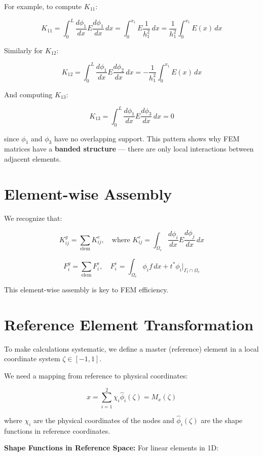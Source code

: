 \documentclass[
  11pt,
  a4paper,
]{scrbook}
\begin{document}
For example, to compute \(K_{11}\):

\[K_{11} = \int_0^L \frac{d\phi_1}{dx} E \frac{d\phi_1}{dx} \, dx = \int_0^{x_1} E \frac{1}{h_1^2} \, dx = \frac{1}{h_1^2} \int_0^{x_1} E(x) \, dx\]

Similarly for \(K_{12}\):

\[K_{12} = \int_0^L \frac{d\phi_1}{dx} E \frac{d\phi_2}{dx} \, dx = -\frac{1}{h_1^2} \int_0^{x_1} E(x) \, dx\]

And computing \(K_{13}\):

\[K_{13} = \int_0^L \frac{d\phi_1}{dx} E \frac{d\phi_3}{dx} \, dx = 0\]

since \(\phi_1\) and \(\phi_3\) have no overlapping support. This
pattern shows why FEM matrices have a \textbf{banded structure} ---
there are only local interactions between adjacent elements.

\section{Element-wise Assembly}\label{element-wise-assembly}

We recognize that:

\[K_{ij}^g = \sum_{\text{elem}} K_{ij}^e, \quad \text{where } K_{ij}^e = \int_{\Omega_e} \frac{d\phi_i}{dx} E \frac{d\phi_j}{dx} \, dx\]

\[F_i^g = \sum_{\text{elem}} F_i^e, \quad F_i^e = \int_{\Omega_e} \phi_i f \, dx + t^* \phi_i|_{\Gamma_t \cap \Omega_e}\]

This element-wise assembly is key to FEM efficiency.

\section{Reference Element
Transformation}\label{reference-element-transformation}

To make calculations systematic, we define a master (reference) element
in a local coordinate system \(\zeta \in [-1, 1]\).

We need a mapping from reference to physical coordinates:

\[x = \sum_{i=1}^2 \chi_i \hat{\phi}_i(\zeta) = M_x(\zeta)\]

where \(\chi_i\) are the physical coordinates of the nodes and
\(\hat{\phi}_i(\zeta)\) are the shape functions in reference
coordinates.

\textbf{Shape Functions in Reference Space:} For linear elements in 1D:
\end{document}
